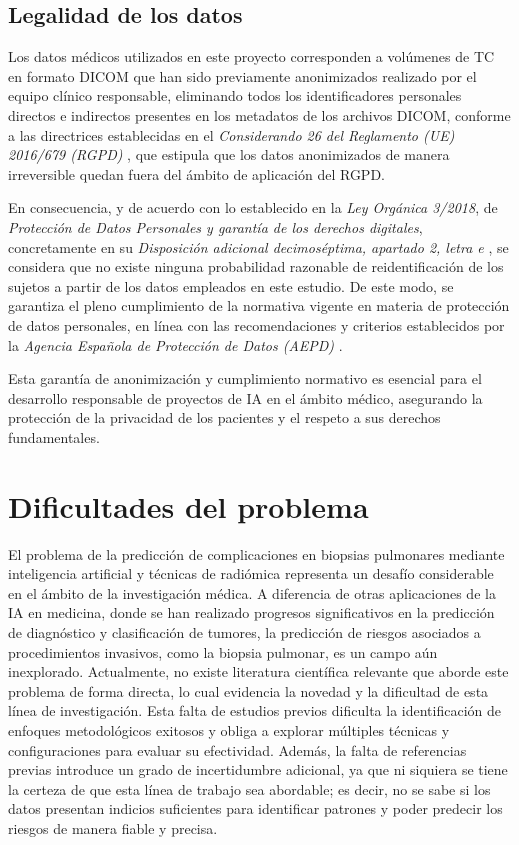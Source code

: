 \subsection{Legalidad de los datos}
Los datos médicos utilizados en este proyecto corresponden a volúmenes de TC en formato DICOM que han sido previamente anonimizados realizado por el equipo clínico responsable, eliminando todos los identificadores personales directos e indirectos presentes en los metadatos de los archivos DICOM, conforme a las directrices establecidas en el \emph{Considerando 26 del Reglamento (UE) 2016/679 (RGPD)} \parencite{gdprRecital26}, que estipula que los datos anonimizados de manera irreversible quedan fuera del ámbito de aplicación del RGPD.

En consecuencia, y de acuerdo con lo establecido en la \emph{Ley Orgánica 3/2018}, de \emph{Protección de Datos Personales y garantía de los derechos digitales}, concretamente en su \emph{Disposición adicional decimoséptima, apartado 2, letra e} \parencite{lopd2018}, se considera que no existe ninguna probabilidad razonable de reidentificación de los sujetos a partir de los datos empleados en este estudio. De este modo, se garantiza el pleno cumplimiento de la normativa vigente en materia de protección de datos personales, en línea con las recomendaciones y criterios establecidos por la \emph{Agencia Española de Protección de Datos (AEPD)} \parencite{aepdAnonimizacion}.

Esta garantía de anonimización y cumplimiento normativo es esencial para el desarrollo responsable de proyectos de IA en el ámbito médico, asegurando la protección de la privacidad de los pacientes y el respeto a sus derechos fundamentales.


\section{Dificultades del problema}
El problema de la predicción de complicaciones en biopsias pulmonares mediante inteligencia artificial y técnicas de radiómica representa un desafío considerable en el ámbito de la investigación médica. A diferencia de otras aplicaciones de la IA en medicina, donde se han realizado progresos significativos en la predicción de diagnóstico y clasificación de tumores, la predicción de riesgos asociados a procedimientos invasivos, como la biopsia pulmonar, es un campo aún inexplorado. Actualmente, no existe literatura científica relevante que aborde este problema de forma directa, lo cual evidencia la novedad y la dificultad de esta línea de investigación. Esta falta de estudios previos dificulta la identificación de enfoques metodológicos exitosos y obliga a explorar múltiples técnicas y configuraciones para evaluar su efectividad. Además, la falta de referencias previas introduce un grado de incertidumbre adicional, ya que ni siquiera se tiene la certeza de que esta línea de trabajo sea abordable; es decir, no se sabe si los datos presentan indicios suficientes para identificar patrones y poder predecir los riesgos de manera fiable y precisa.


